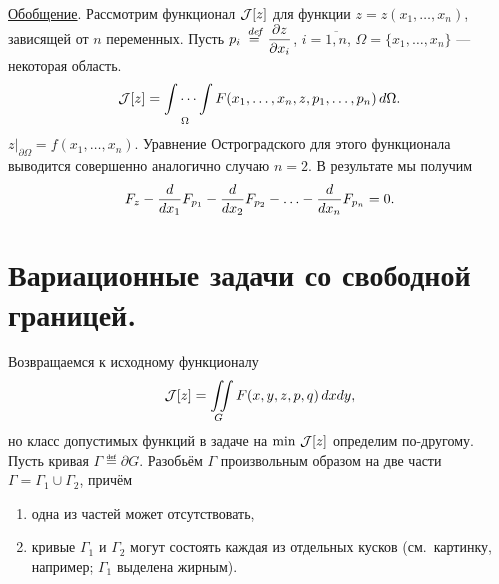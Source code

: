 \noindent\underline{Обобщение}. Рассмотрим функционал $\mathcal{J}[z]$ для функции $z=z(x_1,\ldots,x_n)$, зависящей от $n$ переменных. Пусть $\displaystyle p_i\stackrel{\hspace{0.09 cm}de\!f}{=}\frac{\partial z}{\partial x_i}$, $i=\overline{1,n}$, $\Omega=\{x_1,\ldots,x_n\}$ --- некоторая область.
\begin{equation*}
	\hfill\J[z]=\idotsint\limits_{\Omega}F(x_1,\ldots,x_n,z,p_1,\ldots,p_n)\,d\Omega.\hfill
\end{equation*}
$z\Big|_{\partial\Omega}=f(x_1,\ldots,x_n)$. Уравнение Остроградского для этого функционала выводится совершенно аналогично случаю $n=2$. В результате мы получим 
\begin{equation*}
	\hfill F_z-\der{}{x_1}F_{p_1}-\der{}{x_2}F_{p_2}-\ldots-\der{}{x_n}F_{p_n}=0.\hfill
\end{equation*}
\section{Вариационные задачи со свободной границей.}
\label{lecture9section3}
Возвращаемся к исходному функционалу
\begin{equation*}
	\hfill\J[z]=\iint\limits_{G}F(x,y,z,p,q)\,dxdy,\hfill
\end{equation*}
но класс допустимых функций в задаче на $\min\,\mathcal{J}[z]$ определим по-другому. Пусть кривая $\Gamma\eqdef\partial G$. Разобьём $\Gamma$ произвольным образом на две части $\Gamma=\Gamma_1\cup \Gamma_2$, причём 
\begin{enumerate}
	\item одна из частей может отсутствовать,
	\item кривые $\Gamma_1$ и $\Gamma_2$ могут состоять каждая из отдельных кусков (см.~картинку, например; $\Gamma_1$ выделена жирным).
\end{enumerate} 



